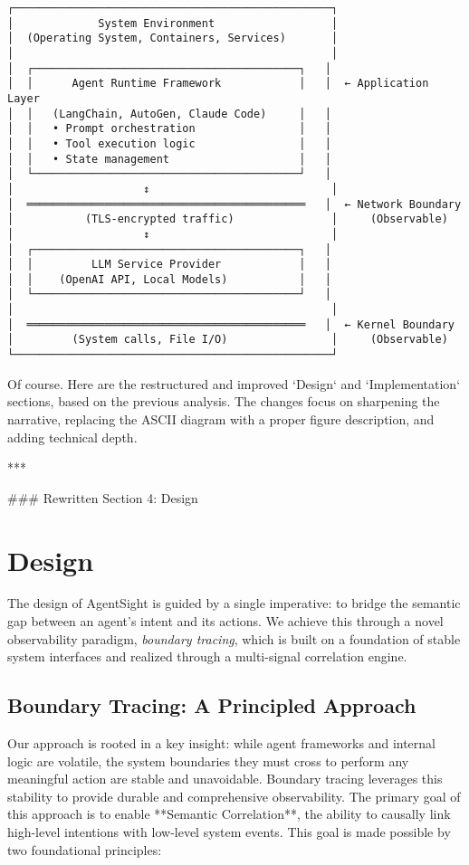 
\begin{center}
\begin{Verbatim}[fontsize=\small, commandchars=\\\{\}]
┌─────────────────────────────────────────────────┐
│             System Environment                  │
│  (Operating System, Containers, Services)       │
│                                                 │
│  ┌─────────────────────────────────────────┐   │
│  │      Agent Runtime Framework            │   │  ← Application Layer
│  │   (LangChain, AutoGen, Claude Code)     │   │
│  │   • Prompt orchestration                │   │
│  │   • Tool execution logic                │   │
│  │   • State management                    │   │
│  └─────────────────────────────────────────┘   │
│                    ↕                            │
│  ═══════════════════════════════════════════   │  ← Network Boundary
│           (TLS-encrypted traffic)               │     (Observable)
│                    ↕                            │
│  ┌─────────────────────────────────────────┐   │
│  │         LLM Service Provider            │   │
│  │    (OpenAI API, Local Models)           │   │
│  └─────────────────────────────────────────┘   │
│                                                 │
│  ═══════════════════════════════════════════   │  ← Kernel Boundary
│         (System calls, File I/O)                │     (Observable)
└─────────────────────────────────────────────────┘
\end{Verbatim}
\end{center}

Of course. Here are the restructured and improved `Design` and `Implementation` sections, based on the previous analysis. The changes focus on sharpening the narrative, replacing the ASCII diagram with a proper figure description, and adding technical depth.

***

### Rewritten Section 4: Design

\section{Design}
The design of AgentSight is guided by a single imperative: to bridge the semantic gap between an agent's intent and its actions. We achieve this through a novel observability paradigm, \emph{boundary tracing}, which is built on a foundation of stable system interfaces and realized through a multi-signal correlation engine.

\subsection{Boundary Tracing: A Principled Approach}
Our approach is rooted in a key insight: while agent frameworks and internal logic are volatile, the system boundaries they must cross to perform any meaningful action are stable and unavoidable. Boundary tracing leverages this stability to provide durable and comprehensive observability. The primary goal of this approach is to enable **Semantic Correlation**, the ability to causally link high-level intentions with low-level system events. This goal is made possible by two foundational principles:

